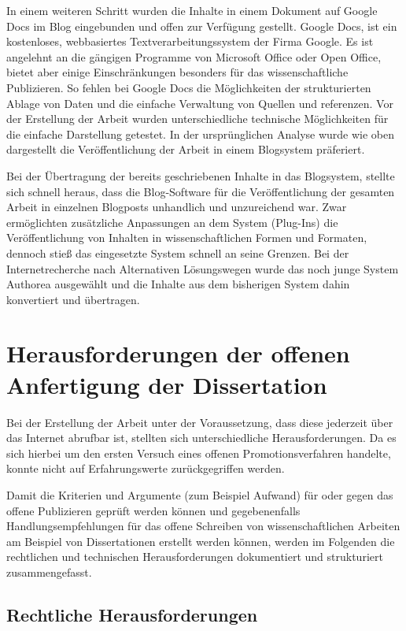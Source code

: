 In einem weiteren Schritt wurden die Inhalte in einem Dokument auf Google Docs im Blog eingebunden und offen zur Verfügung gestellt. Google Docs, ist ein kostenloses, webbasiertes Textverarbeitungssystem der Firma Google. Es ist angelehnt an die gängigen Programme von Microsoft Office oder Open Office, bietet aber einige Einschränkungen besonders für das wissenschaftliche Publizieren. So fehlen bei Google Docs die Möglichkeiten der strukturierten Ablage von Daten und die einfache Verwaltung von Quellen und referenzen. Vor der Erstellung der Arbeit wurden unterschiedliche technische Möglichkeiten für die einfache Darstellung getestet. In der ursprünglichen Analyse wurde wie oben dargestellt die Veröffentlichung der Arbeit in einem Blogsystem präferiert.

Bei der Übertragung der bereits geschriebenen Inhalte in das Blogsystem, stellte sich schnell heraus, dass die Blog-Software für die Veröffentlichung der gesamten Arbeit in einzelnen Blogposts unhandlich und unzureichend war. Zwar ermöglichten zusätzliche Anpassungen an dem System (Plug-Ins) die Veröffentlichung von Inhalten in wissenschaftlichen Formen und Formaten, dennoch stieß das eingesetzte System schnell an seine Grenzen. Bei der Internetrecherche nach Alternativen Lösungswegen wurde das noch junge System Authorea ausgewählt und die Inhalte aus dem bisherigen System dahin konvertiert und übertragen.

\section{Herausforderungen der offenen Anfertigung der Dissertation}

Bei der Erstellung der Arbeit unter der Voraussetzung, dass diese jederzeit über das Internet abrufbar ist, stellten sich unterschiedliche Herausforderungen. Da es sich hierbei um den ersten Versuch eines offenen Promotionsverfahren handelte, konnte nicht auf Erfahrungswerte zurückgegriffen werden.

Damit die Kriterien und Argumente (zum Beispiel Aufwand) für oder gegen das offene Publizieren geprüft werden können und gegebenenfalls Handlungsempfehlungen für das offene Schreiben von wissenschaftlichen Arbeiten am Beispiel von Dissertationen erstellt werden können, werden im Folgenden die rechtlichen und technischen Herausforderungen dokumentiert und strukturiert zusammengefasst.

\subsection{Rechtliche Herausforderungen}

